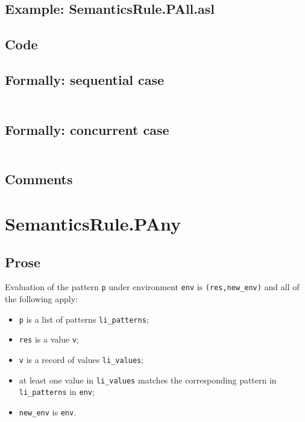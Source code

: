 \documentclass{book}
\begin{document}
  \subsection{Example: SemanticsRule.PAll.asl}

  \subsection{Code}

  \subsection{Formally: sequential case}
  \begin{align}
  \end{align} 

  \subsection{Formally: concurrent case}
  \begin{align}
  \end{align} 

  \subsection{Comments}

\section{SemanticsRule.PAny \label{sec:SemanticsRule.PAny}}

    \subsection{Prose}
  Evaluation of the pattern \texttt{p} under environment \texttt{env} is
  \texttt{(res,new\_env)} and all of the following apply:
    \begin{itemize}
    \item \texttt{p} is a list of patterns \texttt{li\_patterns};
    \item \texttt{res} is a value \texttt{v};
    \item \texttt{v} is a record of values \texttt{li\_values};
    \item at least one value in \texttt{li\_values} matches the corresponding
pattern in \texttt{li\_patterns} in \texttt{env};
    \item \texttt{new\_env} is \texttt{env}.
    \end{itemize}
\end{document}
